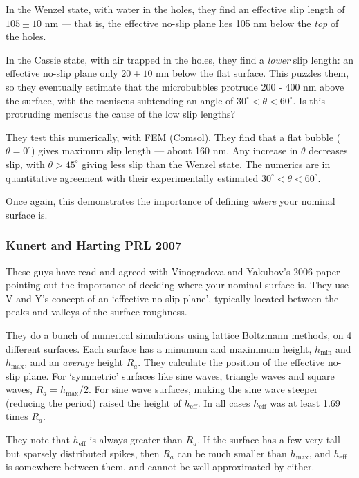 \documentclass{article}
\begin{document}
In the Wenzel state, with water in the holes, they find an effective slip length of $105 \pm 10$ nm --- that is, the effective no-slip plane lies 105 nm below the \emph{top} of the holes.

In the Cassie state, with air trapped in the holes, they find a \emph{lower} slip length: an effective no-slip plane only $20\pm 10$ nm below the flat surface.  This puzzles them, so they eventually estimate that the microbubbles protrude 200 - 400 nm above the surface, with the meniscus subtending an angle of $30^{\circ} < \theta < 60^{\circ}$. Is this protruding meniscus the cause of the low slip lengths?

They test this numerically, with FEM (Comsol). They find that a flat bubble ($\theta=0^{\circ}$) gives maximum slip length --- about 160 nm.  Any increase in $\theta$ decreases slip, with $\theta > 45^{\circ}$ giving less slip than the Wenzel state.  The numerics are in quantitative agreement with their experimentally estimated $30^{\circ} < \theta < 60^{\circ}$.

Once again, this demonstrates the importance of defining \emph{where} your nominal surface is.



\subsubsection*{Kunert and Harting PRL 2007}

These guys have read and agreed with Vinogradova and Yakubov's 2006 paper pointing out the importance of deciding where your nominal surface is.  They use V and Y's concept of an `effective no-slip plane', typically located between the peaks and valleys of the surface roughness.

They do a bunch of numerical simulations using lattice Boltzmann methods, on 4 different surfaces.  Each surface has a minumum and maximmum height, $h_{\mathrm{min}}$ and $h_{\mathrm{max}}$, and an \emph{average} height $R_{a}$.  They calculate the position of the effective no-slip plane.  For `symmetric' surfaces like sine waves, triangle waves and square waves, $R_{a} = h_{\mathrm{max}}/2$. For sine wave surfaces, making the sine wave steeper (reducing the period) raised the height of $h_{\mathrm{eff}}$.  In all cases $h_{\mathrm{eff}}$ was at least 1.69 times $R_{a}$.

They note that $h_{\mathrm{eff}}$ is always greater than $R_{a}$.  If the surface has a few very tall but sparsely distributed spikes, then $R_{a}$ can be much smaller than $h_{\mathrm{max}}$, and $h_{\mathrm{eff}}$ is somewhere between them, and cannot be well approximated by either.
\end{document}
